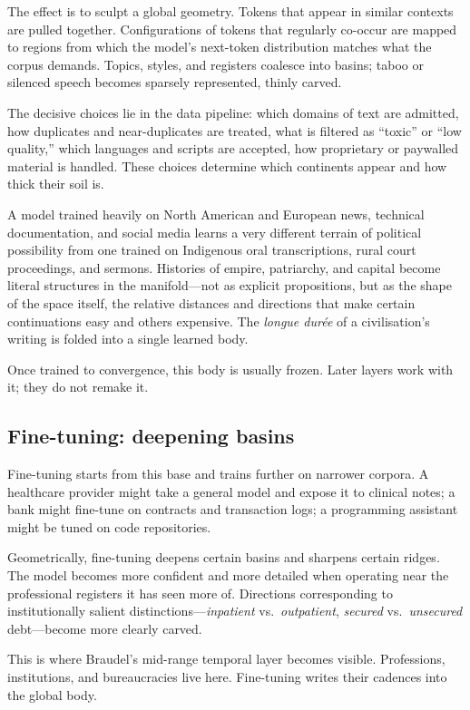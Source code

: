 \documentclass[12pt,a4paper]{article}
\begin{document}
The effect is to sculpt a global geometry. Tokens that appear in similar contexts are pulled together. Configurations of tokens that regularly co-occur are mapped to regions from which the model's next-token distribution matches what the corpus demands. Topics, styles, and registers coalesce into basins; taboo or silenced speech becomes sparsely represented, thinly carved.

The decisive choices lie in the data pipeline: which domains of text are admitted, how duplicates and near-duplicates are treated, what is filtered as ``toxic'' or ``low quality,'' which languages and scripts are accepted, how proprietary or paywalled material is handled. These choices determine which continents appear and how thick their soil is.

A model trained heavily on North American and European news, technical documentation, and social media learns a very different terrain of political possibility from one trained on Indigenous oral transcriptions, rural court proceedings, and sermons. Histories of empire, patriarchy, and capital become literal structures in the manifold---not as explicit propositions, but as the shape of the space itself, the relative distances and directions that make certain continuations easy and others expensive. The \emph{longue dur\'{e}e} of a civilisation's writing is folded into a single learned body.

Once trained to convergence, this body is usually frozen. Later layers work with it; they do not remake it.

\subsection*{Fine-tuning: deepening basins}

Fine-tuning starts from this base and trains further on narrower corpora. A healthcare provider might take a general model and expose it to clinical notes; a bank might fine-tune on contracts and transaction logs; a programming assistant might be tuned on code repositories.

Geometrically, fine-tuning deepens certain basins and sharpens certain ridges. The model becomes more confident and more detailed when operating near the professional registers it has seen more of. Directions corresponding to institutionally salient distinctions---\emph{inpatient} vs.\ \emph{outpatient}, \emph{secured} vs.\ \emph{unsecured} debt---become more clearly carved.

This is where Braudel's mid-range temporal layer becomes visible. Professions, institutions, and bureaucracies live here. Fine-tuning writes their cadences into the global body.
\end{document}
